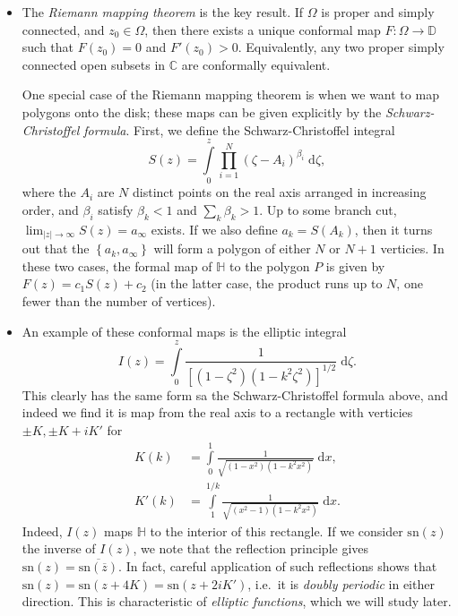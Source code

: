 \documentclass[11pt,
        usenames, %
        dvipsnames %
    ]{report}
\newcommand*{\abs}[1]{\left|#1\right|}
\newcommand*{\p}[1]{\left(#1\right)}
\newcommand*{\s}[1]{\left[#1\right]}
\newcommand*{\z}[1]{\left\{#1\right\}}
\begin{document}
\begin{itemize}
    \item The \emph{Riemann mapping theorem} is the key result. If $\Omega$ is
        proper and simply connected, and $z_0 \in \Omega$, then there exists a
        unique conformal map $F: \Omega \to \mathbb{D}$ such that $F(z_0) = 0$
        and $F'(z_0) > 0$. Equivalently, any two proper simply connected open
        subsets in $\mathbb{C}$ are conformally equivalent.

        One special case of the Riemann mapping theorem is when we want to map
        polygons onto the disk; these maps can be given explicitly by the
        \emph{Schwarz-Christoffel formula}. First, we define the
        Schwarz-Christoffel integral
        \begin{equation}
            S(z) = \int\limits_0^z \prod_{i=1}^N \p{\zeta - A_i}^{\beta_i}
                \;\mathrm{d}\zeta,
        \end{equation}
        where the $A_i$ are $N$ distinct points on the real axis arranged in
        increasing order, and $\beta_i$ satisfy $\beta_k < 1$ and $\sum\limits_k
        \beta_k > 1$. Up to some branch cut, $\lim_{\abs{z} \to \infty} S(z) =
        a_\infty$ exists. If we also define $a_k = S(A_k)$, then it turns out
        that the $\z{a_k, a_\infty}$ will form a polygon of either $N$ or $N +
        1$ verticies. In these two cases, the formal map of $\mathbb{H}$ to the
        polygon $P$ is given by $F(z) = c_1 S(z) + c_2$ (in the latter case, the
        product runs up to $N$, one fewer than the number of vertices).

    \item An example of these conformal maps is the elliptic integral
        \begin{equation}
            I(z) = \int\limits_0^z \frac{1}{\s{\p{1 - \zeta^2}
                \p{1 - k^2\zeta^2}}^{1/2}}\;\mathrm{d}\zeta.
        \end{equation}
        This clearly has the same form sa the Schwarz-Christoffel formula above,
        and indeed we find it is map from the real axis to a rectangle with
        verticies $\pm K, \pm K + iK'$ for
        \begin{align}
            K(k) &= \int\limits_{0}^1\frac{1}{\sqrt{\p{1 - x^2}
                \p{1 - k^2x^2}}}\;\mathrm{d}x,\\
            K'(k) &= \int\limits_1^{1/k}\frac{1}{\sqrt{
                \p{x^2 - 1}\p{1 - k^2x^2}}}\;\mathrm{d}x.
        \end{align}
        Indeed, $I(z)$ maps $\mathbb{H}$ to the interior of this rectangle. If
        we consider $\mathrm{sn}(z)$ the inverse of $I(z)$, we note that the
        reflection principle gives $\mathrm{sn}(z) =
        \overline{\mathrm{sn}\p{\overline{z}}}$. In fact, careful application of
        such reflections shows that $\mathrm{sn}(z) = \mathrm{sn}(z + 4K) =
        \mathrm{sn}\p{z + 2iK'}$, i.e.\ it is \emph{doubly periodic} in either
        direction. This is characteristic of \emph{elliptic functions}, which we
        will study later.
\end{itemize}
\end{document}
